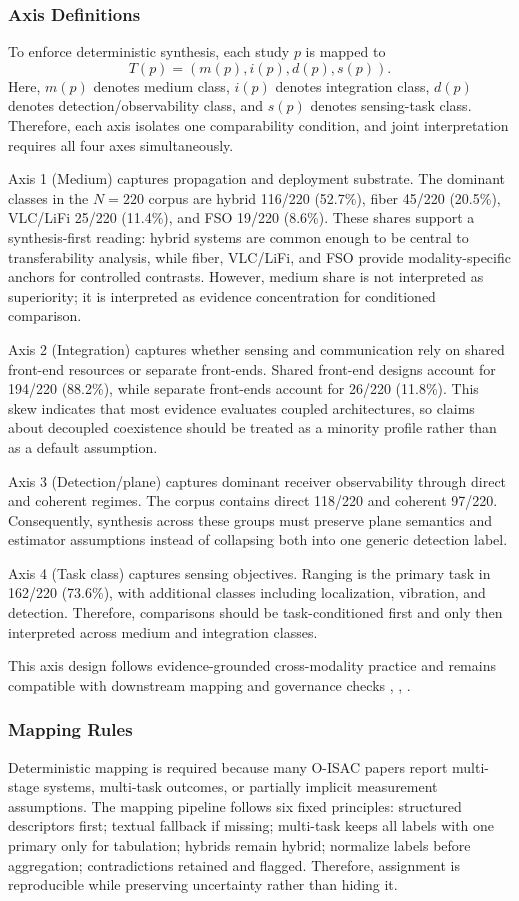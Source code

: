 \subsubsection{Axis Definitions}
To enforce deterministic synthesis, each study $p$ is mapped to
\[
T(p) = (m(p), i(p), d(p), s(p)).
\]
Here, $m(p)$ denotes medium class, $i(p)$ denotes integration class, $d(p)$ denotes detection/observability class, and $s(p)$ denotes sensing-task class. Therefore, each axis isolates one comparability condition, and joint interpretation requires all four axes simultaneously.

Axis 1 (Medium) captures propagation and deployment substrate. The dominant classes in the $N=220$ corpus are hybrid 116/220 (52.7\%), fiber 45/220 (20.5\%), VLC/LiFi 25/220 (11.4\%), and FSO 19/220 (8.6\%). These shares support a synthesis-first reading: hybrid systems are common enough to be central to transferability analysis, while fiber, VLC/LiFi, and FSO provide modality-specific anchors for controlled contrasts. However, medium share is not interpreted as superiority; it is interpreted as evidence concentration for conditioned comparison.

Axis 2 (Integration) captures whether sensing and communication rely on shared front-end resources or separate front-ends. Shared front-end designs account for 194/220 (88.2\%), while separate front-ends account for 26/220 (11.8\%). This skew indicates that most evidence evaluates coupled architectures, so claims about decoupled coexistence should be treated as a minority profile rather than as a default assumption.

Axis 3 (Detection/plane) captures dominant receiver observability through direct and coherent regimes. The corpus contains direct 118/220 and coherent 97/220. Consequently, synthesis across these groups must preserve plane semantics and estimator assumptions instead of collapsing both into one generic detection label.

Axis 4 (Task class) captures sensing objectives. Ranging is the primary task in 162/220 (73.6\%), with additional classes including localization, vibration, and detection. Therefore, comparisons should be task-conditioned first and only then interpreted across medium and integration classes.

This axis design follows evidence-grounded cross-modality practice and remains compatible with downstream mapping and governance checks \cite{O_ISAC_021}, \cite{O_ISAC_039}, \cite{O_ISAC_077}.

\subsubsection{Mapping Rules}
Deterministic mapping is required because many O-ISAC papers report multi-stage systems, multi-task outcomes, or partially implicit measurement assumptions. The mapping pipeline follows six fixed principles: structured descriptors first; textual fallback if missing; multi-task keeps all labels with one primary only for tabulation; hybrids remain hybrid; normalize labels before aggregation; contradictions retained and flagged. Therefore, assignment is reproducible while preserving uncertainty rather than hiding it.

